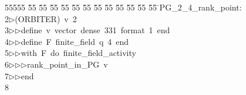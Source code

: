 %
%
\begin{tabbing}
55555 \= 55 \= 55 \= 55 \= 55 \= 55 \= 55 \= 55 \= 55 \= 55 \= 55 \= 55 \= 55 \= \>PG\_2\_4\_rank\_point:\\[0pt]
2\>$\triangleright$\>(ORBITER)\ v\ 2\ \\[0pt]
3\>$\triangleright$\>$\triangleright$\>define\ v\ vector\ dense\ 331\ format\ 1\ end\ \\[0pt]
4\>$\triangleright$\>$\triangleright$\>define\ F\ finite\_field\ q\ 4\ end\ \\[0pt]
5\>$\triangleright$\>$\triangleright$\>with\ F\ do\ finite\_field\_activity\ \\[0pt]
6\>$\triangleright$\>$\triangleright$\>$\triangleright$\>rank\_point\_in\_PG\ v\ \\[0pt]
7\>$\triangleright$\>$\triangleright$\>end\\[0pt]
8\>\end{tabbing}

